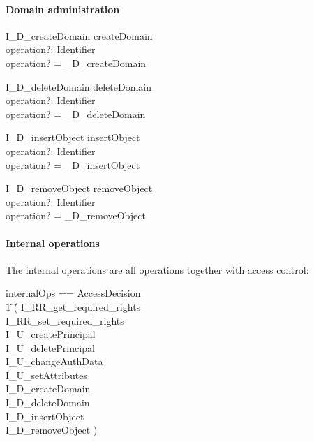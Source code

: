 \paragraph{Domain administration}
\begin{zedgroup}
\begin{schema}{I\_D\_createDomain}
  createDomain \\
  operation?: Identifier \\
  \where
  operation? = \_D\_createDomain \\
\end{schema}
\begin{schema}{I\_D\_deleteDomain}
  deleteDomain \\
  operation?: Identifier \\
  \where
  operation? = \_D\_deleteDomain \\
\end{schema}
\begin{schema}{I\_D\_insertObject}
  insertObject \\
  operation?: Identifier \\
  \where
  operation? = \_D\_insertObject \\
\end{schema}
\begin{schema}{I\_D\_removeObject}
  removeObject \\
  operation?: Identifier \\
  \where
  operation? = \_D\_removeObject \\
\end{schema}
\end{zedgroup}


\paragraph{Internal operations}
The internal operations are all operations together with access control:
\begin{zed}
  internalOps == AccessDecision \land \\
  \t1 ( \< I\_RR\_get\_required\_rights \lor \\
  I\_RR\_set\_required\_rights \lor \\
  I\_U\_createPrincipal \lor \\
  I\_U\_deletePrincipal \lor \\
  I\_U\_changeAuthData \lor \\
  I\_U\_setAttributes \lor \\
  I\_D\_createDomain \lor \\
  I\_D\_deleteDomain \lor \\
  I\_D\_insertObject \lor \\
  I\_D\_removeObject ) \>
\end{zed}


